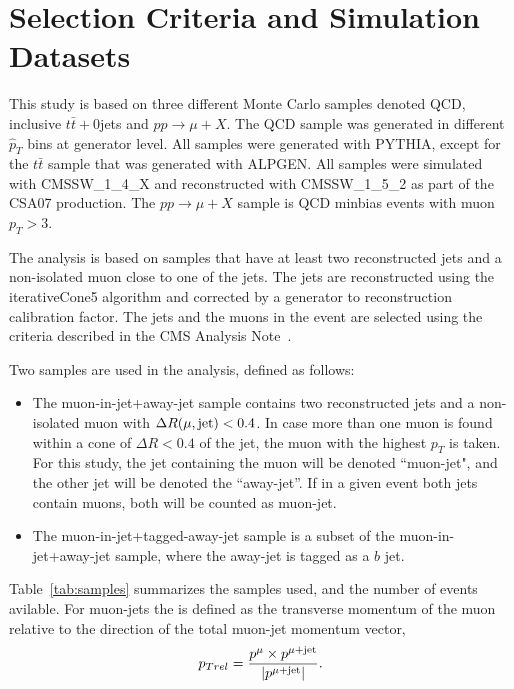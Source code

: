 \section{Selection Criteria and Simulation Datasets}
\label{sec:samples}

This study is based on three different Monte Carlo samples denoted QCD, 
inclusive $t\bar{t}+0$jets and $pp\rightarrow \mu +X$. The QCD sample 
was generated in different $\hat{p}_T $ bins at generator level. All
samples were generated with PYTHIA, except for the $t\bar{t} $ sample 
that was generated with ALPGEN. All samples were simulated with 
CMSSW\_1\_4\_X and reconstructed with CMSSW\_1\_5\_2 as part of the CSA07
production. The $pp\rightarrow \mu +X $ sample is QCD minbias events with
muon $p_T > 3 $.

The analysis is based on samples that have at least two reconstructed jets 
and a non-isolated muon close to one of the jets. The jets are reconstructed 
using the iterativeCone5 algorithm and corrected by a generator to 
reconstruction calibration factor. The jets and the muons in the event are
selected using the criteria described in the CMS Analysis 
Note~\cite{ref:btag_oldnote}.

Two samples are used in the analysis, defined as follows:
\begin{itemize} 
\item The  muon-in-jet+away-jet sample contains two reconstructed jets
and a non-isolated muon with $\Delta R(\mu,{\rm jet})<0.4$. In case 
more than one muon is found within a cone of $\Delta R<0.4$ of the jet, the 
muon with the highest $p_T$ is taken. For this study, the jet containing the 
muon will be denoted ``muon-jet",  and the other jet will be denoted the 
``away-jet''. If in a given event both jets contain muons, both will be 
counted as muon-jet. 
\item The muon-in-jet+tagged-away-jet sample is a subset of the 
muon-in-jet+away-jet sample, where the away-jet is tagged as a $b$ jet. 
\end{itemize}

Table~\ref{tab:samples} summarizes the samples used, and the number 
of events avilable.
For muon-jets the \ptrel is defined as the transverse momentum of the muon 
relative to the direction of the total muon-jet momentum vector, 
\begin{equation}
p_{Trel}=\frac{p^{\mu} \times p^{\mu + {\rm jet}}}{|p^{\mu + {\rm jet}}|}.
\end{equation}

